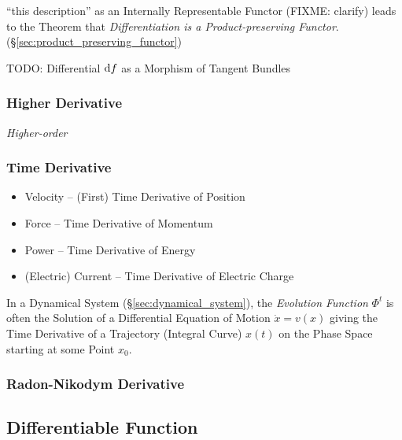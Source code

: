 {``this description'' as an Internally Representable Functor (FIXME: clarify)
leads to the Theorem that \emph{Differentiation is a Product-preserving
  Functor}. (\S\ref{sec:product_preserving_functor})

TODO: Differential $\mathrm{d}f$ as a Morphism of Tangent Bundles



\subsubsection{Higher Derivative}\label{sec:higher_derivative}

\emph{Higher-order}



\subsubsection{Time Derivative}\label{sec:time_derivative}

\begin{itemize}
  \item Velocity -- (First) Time Derivative of Position
  \item Force -- Time Derivative of Momentum
  \item Power -- Time Derivative of Energy
  \item (Electric) Current -- Time Derivative of Electric Charge
\end{itemize}

In a Dynamical System (\S\ref{sec:dynamical_system}), the \emph{Evolution
  Function} $\Phi^t$ is often the Solution of a Differential Equation of Motion
$\dot{x} = v(x)$ giving the Time Derivative of a Trajectory (Integral Curve)
$x(t)$ on the Phase Space starting at some Point $x_0$.



\subsubsection{Radon-Nikodym Derivative}\label{sec:radon_nikodym}




\subsection{Differentiable Function}\label{sec:differentiable_function}

}
